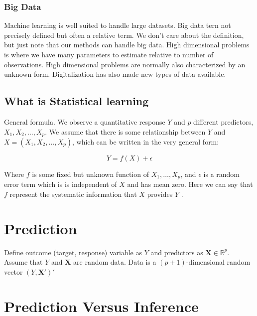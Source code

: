 \documentclass[11pt,a4paper]{article}
\begin{document}
\subsubsection{Big Data}

Machine learning is well suited to handle large datasets. Big data tern not precisely defined but often a relative term. We don't care about the definition, but just note that our methods can handle big data.
\newline
High dimensional problems is where we have many parameters to estimate relative to number of observations. High dimensional problems are normally also characterized by an unknown form. Digitalization has also made new types of data available.

\subsection{What is Statistical learning}

General formula. We observe a quantitative response \(Y\) and \(p\)
different predictors, \(X_{1}, X_{2}, \ldots, X_{p}\). We assume that there is some
relationship between \(Y\) and \(X=\left(X_{1}, X_{2}, \ldots, X_{p}\right)\), which can be written
in the very general form:

\begin{equation}
    Y=f(X)+\epsilon
\end{equation}

Where $f$ is some fixed but unknown function of $X_{1}, \ldots, X_{p}$, and $\epsilon$ is a random error term which is is independent of $X$ and has mean zero. Here we can say that $f$ represent the systematic information that $X$ provides $Y$ \cite{james2013introduction}.

\section{Prediction}

Define outcome (target, response) variable as $Y$ and predictors as $\mathbf{X}\in \mathbb{R}^p$.
Assume that $Y$ and $\mathbf{X}$ are random data.
Data is a $(p+1)$-dimensional random vector $(Y,\mathbf{X}')'$

\section{Prediction Versus Inference}
\end{document}
